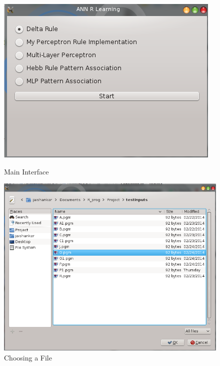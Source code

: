 \documentclass[a4paper,12pt]{report}
\begin{document}
\begin{figure}

\includegraphics[width=\linewidth]{maingui.png}
 \caption{Main Interface} 
 
 \includegraphics[width=\linewidth]{choosefile.png}
 \caption{Choosing a File} 
 \end{figure}
 
\end{document}
